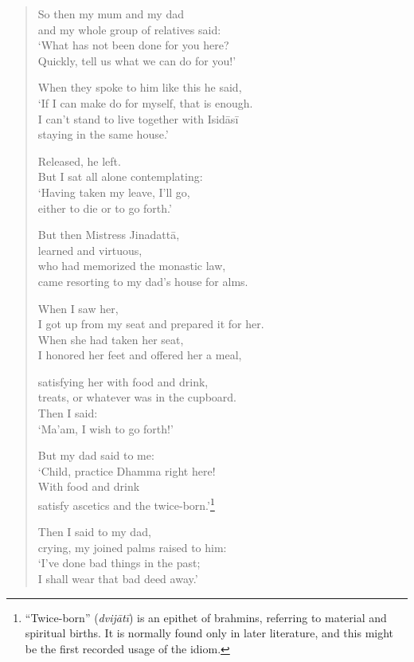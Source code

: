 \documentclass[12pt,openany]{book}%
\begin{document}
\begin{verse}
So then my mum and my dad \\
and my whole group of relatives said: \\
‘What has not been done for you here? \\
Quickly, tell us what we can do for you!’ 

When they spoke to him like this he said, \\
‘If I can make do for myself, that is enough. \\
I can’t stand to live together with \textsanskrit{Isidāsī} \\
staying in the same house.’ 

Released, he left. \\
But I sat all alone contemplating: \\
‘Having taken my leave, I’ll go, \\
either to die or to go forth.’ 

But then Mistress \textsanskrit{Jinadattā}, \\
learned and virtuous, \\
who had memorized the monastic law, \\
came resorting to my dad’s house for alms. 

When I saw her, \\
I got up from my seat and prepared it for her. \\
When she had taken her seat, \\
I honored her feet and offered her a meal, 

satisfying her with food and drink, \\
treats, or whatever was in the cupboard. \\
Then I said: \\
‘Ma’am, I wish to go forth!’ 

But my dad said to me: \\
‘Child, practice Dhamma right here! \\
With food and drink \\
satisfy ascetics and the twice-born.’\footnote{“Twice-born” (\textit{\textsanskrit{dvijātī}}) is an epithet of brahmins, referring to material and spiritual births. It is normally found only in later literature, and this might be the first recorded usage of the idiom. } 

Then I said to my dad, \\
crying, my joined palms raised to him: \\
‘I’ve done bad things in the past; \\
I shall wear that bad deed away.’ 


\end{verse}
\end{document}
